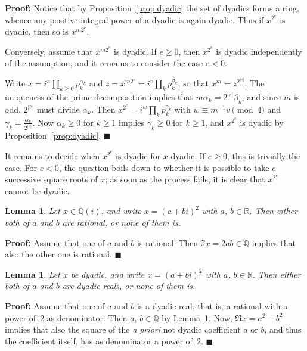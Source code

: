 \documentclass [11pt]{article}
\newcommand {\Q}{\mathbb Q}
\newcommand {\R}{\mathbb R}
\renewcommand {\geq}{\geqslant}
\newtheorem{lemma}[theorem]{Lemma}
\newenvironment{proof}{\noindent \textbf {Proof:}}{{\hspace* {\fill}$\blacksquare$}}
\begin{document}
\begin{proof}
Notice that by Proposition~\ref {prop:dyadic} the set of dyadics forms
a ring, whence any positive integral power of a dyadic is again dyadic.
Thus if $x^{2^e}$ is dyadic, then so is $x^{m 2^e}$.

Conversely, assume that $x^{m 2^e}$ is dyadic. If $e \geq 0$,
then $x^{2^e}$ is dyadic independently of the assumption,
and it remains to consider the case $e < 0$.

Write $x = i^u \prod_{k \geq 0} p_k^{\alpha_k}$
and $z = x^{m 2^e} = i^v \prod_k p_k^{\beta_k}$, so that $x^m = z^{2^{|e|}}$.
The uniqueness of the prime decomposition implies that
$m \alpha_k = 2^{|e|} \beta_k$, and since $m$ is odd, $2^{|e|}$ must
divide $\alpha_k$. Then
$x^{2^e} = i^w \prod_k p_k^{\gamma_k}$ with $w \equiv m^{-1} v \pmod 4$ and
$\gamma_k = \frac {\alpha_k}{2^{|e|}}$.
Now $\alpha_k \geq 0$ for $k \geq 1$ implies $\gamma_k \geq 0$ for $k \geq 1$,
and $x^{2^e}$ is dyadic by Proposition~\ref {prop:dyadic}.
\end{proof}

It remains to decide when $x^{2^e}$ is dyadic for $x$ dyadic. If $e \geq 0$,
this is trivially the case. For $e < 0$, the question boils down to whether
it is possible to take $e$ successive square roots of $x$; as soon as the
process fails, it is clear that $x^{2^e}$ cannot be dyadic.

\begin{lemma}
\label {lm:sqrtrat}
Let $x \in \Q (i)$, and write $x = (a + b i)^2$ with $a$, $b \in \R$.
Then either both of $a$ and $b$ are rational, or none of them is.
\end{lemma}

\begin{proof}
Assume that one of $a$ and $b$ is rational. Then $\Im x = 2 a b \in \Q$
implies that also the other one is rational.
\end{proof}

\begin{lemma}
Let $x$ be dyadic, and write $x = (a + b i)^2$ with $a$, $b \in \R$.
Then either both of $a$ and $b$ are dyadic reals, or none of them is.
\end{lemma}

\begin{proof}
Assume that one of $a$ and $b$ is a dyadic real, that is, a rational with
a power of~$2$ as denominator. Then $a$, $b \in \Q$ by Lemma~\ref {lm:sqrtrat}.
Now, $\Re x = a^2 - b^2$ implies that also the square of the \textit {a priori}
not dyadic coefficient $a$ or $b$, and thus the coefficient itself,
has as denominator a power of~$2$.
\end{proof}
\end{document}
